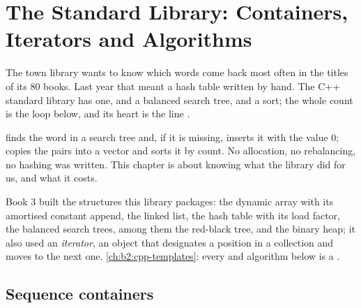 \chapter{The Standard Library: Containers, Iterators and Algorithms}\label{ch:b2:cpp-standard-library}

The town library wants to know which words come back most often in the titles of its 80 books. Last year that
meant a hash table written by hand. The C++ standard library has one, and a balanced search tree, and a sort; the
whole count is the loop below, and its heart is the line .

\label{lst:b2:cpp-standard-library:words}

\label{out:b2:cpp-standard-library:word-count}

 finds the word in a search tree and, if it is missing, inserts it with the value 0;
 copies the pairs into a vector and sorts it by count. No allocation, no rebalancing, no hashing
was written. This chapter is about knowing what the library did for us, and what it costs.

\begin{recall}
Book 3 built the structures this library packages: the dynamic array with its amortised constant append, the
linked list, the hash table with its load factor, the balanced search trees, among them the red-black tree, and the
binary heap; it also used an \emph{iterator}, an object that designates a position in a collection and moves to
the next one. \cref{ch:b2:cpp-templates}: every  and algorithm below is a .
\end{recall}

\section{Sequence containers}\label{sec:b2:cpp-standard-library:sequence}

